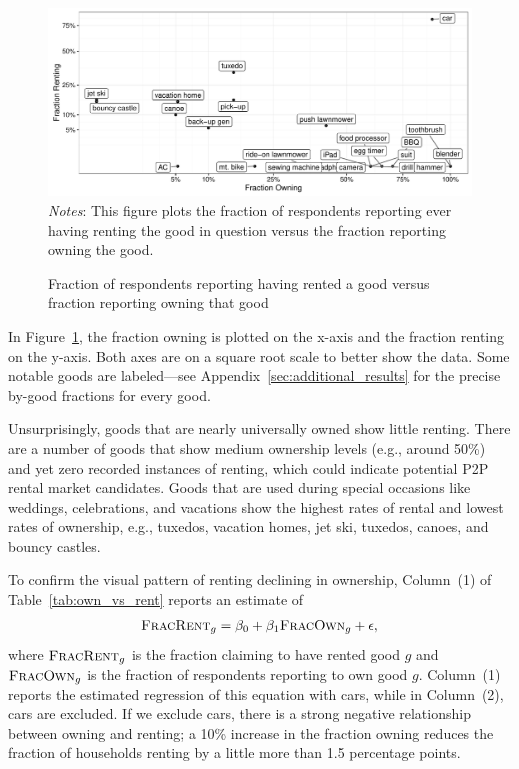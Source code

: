 \documentclass[11pt]{article}
\begin{document}
\begin{figure}
\centering 
\caption{Fraction of respondents reporting having rented a good versus fraction reporting owning that good\label{fig:scatter} }
\begin{minipage}{0.90 \linewidth}
  \includegraphics[width = \linewidth]{./plots/scatter_rent_v_own.pdf} \\
    {\footnotesize
    \emph{Notes}: This figure plots the fraction of respondents reporting ever having renting the good in question versus the fraction reporting owning the good. 
    }
\end{minipage}
\end{figure} 

In Figure~\ref{fig:scatter}, the fraction owning is plotted on the x-axis and the fraction renting on the y-axis.
Both axes are on a square root scale to better show the data. 
Some notable goods are labeled---see Appendix~\ref{sec:additional_results} for the precise by-good fractions for every good.

Unsurprisingly, goods that are nearly universally owned show little renting. 
There are a number of goods that show medium ownership levels (e.g., around 50\%) and yet zero recorded instances of renting, which could indicate potential P2P rental market candidates. 
Goods that are used during special occasions like weddings, celebrations, and vacations show the highest rates of rental and lowest rates of ownership, e.g., tuxedos, vacation homes, jet ski, tuxedos, canoes, and bouncy castles. 



To confirm the visual pattern of renting declining in ownership, Column~(1) of Table~\ref{tab:own_vs_rent} reports an estimate of 
\begin{align}
\textsc{FracRent}_g = \beta_0 + \beta_1 \textsc{FracOwn}_g + \epsilon,  
\end{align} 
where $\textsc{FracRent}_g$ is the fraction claiming to have rented good $g$ and $\textsc{FracOwn}_g$ is the fraction of respondents reporting to own good $g$.
Column~(1) reports the estimated regression of this equation with cars, while in Column~(2), cars are excluded.
If we exclude cars, there is a strong negative relationship between owning and renting;
a 10\% increase in the fraction owning reduces the fraction of households renting by a little more than 1.5 percentage points. 
\end{document}
